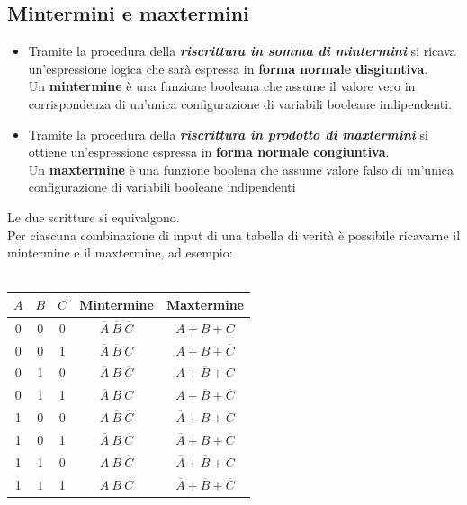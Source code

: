 \documentclass[12pt]{report}
\begin{document}
				\subsection{Mintermini e maxtermini}
					\begin{itemize}
						\item  Tramite la procedura della \textbf{\textit{riscrittura in somma di mintermini}} si ricava un'espressione logica che sarà espressa in \textbf{forma normale disgiuntiva}. \\
						Un \textbf{mintermine} è una funzione booleana che assume il valore vero in corrispondenza di un'unica configurazione di variabili booleane indipendenti.
						\item Tramite la procedura della \textbf{\textit{riscrittura in prodotto di maxtermini}} si ottiene un'espressione espressa in \textbf{forma normale congiuntiva}. \\
						Un \textbf{maxtermine} è una funzione boolena che assume valore falso di un'unica configurazione di variabili booleane indipendenti
					\end{itemize}
					Le due scritture si equivalgono. \\
					Per ciascuna combinazione di input di una tabella di verità è possibile ricavarne il mintermine e il maxtermine, ad esempio: \\ \\
					\begin{tabular}{c|c|c|c|c}
						$A$ & $B$ & $C$ & \textbf{Mintermine} & \textbf{Maxtermine} \\
						\hline
						0 & 0 & 0 & $\overline{A}\ \overline{B}\ \overline{C}$ & $A + B + C$ \\
						0 & 0 & 1 & $\overline{A}\ \overline{B}\ C$ & $A + B + \overline{C}$ \\
						0 & 1 & 0 & $\overline{A}\ B\ \overline{C}$ & $A + \overline{B} + C$ \\
						0 & 1 & 1 & $\overline{A}\ B\ C$ & $A + \overline{B} + \overline{C}$ \\
						1 & 0 & 0 & $A\ \overline{B}\ \overline{C}$ & $\overline{A} + B + C$ \\
						1 & 0 & 1 & $\overline{A}\ B\ \overline{C}$ & $\overline{A} + B + \overline{C}$ \\
						1 & 1 & 0 & $A\ B\ \overline{C}$ & $\overline{A} + \overline{B} + C$ \\
						1 & 1 & 1 & $A\ B\ C$ & $\overline{A} + \overline{B} + \overline{C}$ \\
					\end{tabular} \\ \\
\end{document}
